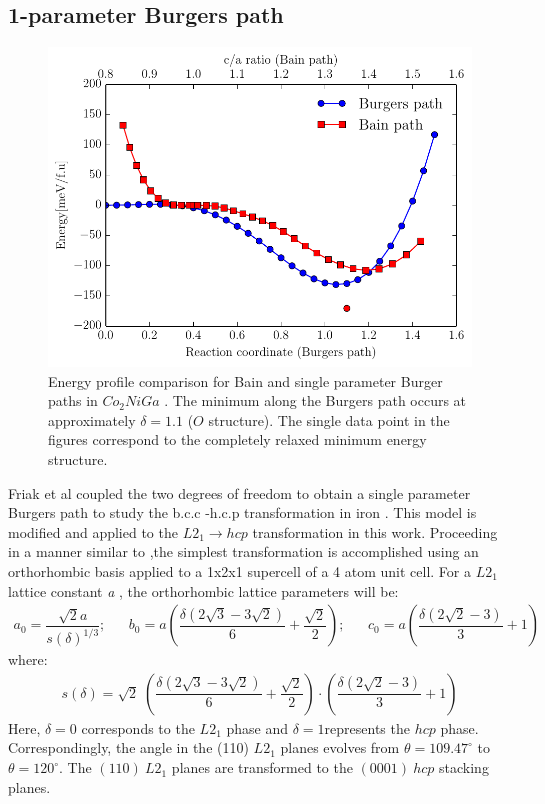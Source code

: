 \documentclass[%
preprint,
 amsmath,amssymb,
 aps,
prb,
showkeys,
]{revtex4-1}
\begin{document}
\subsection{1-parameter Burgers path}
\label{Sec:1D_formalism} 

\begin{figure}[htp!]
\includegraphics[scale=1.0]{figure_1}
\caption{ Energy profile comparison for Bain and single parameter Burger  paths in  $Co_2NiGa$ . The minimum along the Burgers path occurs at approximately $\delta =1.1$ ($O$ structure). The single data point in the figures correspond to the completely relaxed minimum energy structure.}  
\label{burger_bain}
\end{figure}

Friak et al \cite{friak2008ab} coupled the two degrees of freedom to obtain a single parameter Burgers path to study the b.c.c -h.c.p transformation in iron \cite{vsob1998ab,vsob1999proceedings,friak2008ab}. This model is modified and applied to the $L2_1 \rightarrow hcp$ transformation in this work.
Proceeding in a manner similar to \cite{friak2008ab},the simplest transformation is accomplished using  an orthorhombic basis applied to a 1x2x1 supercell of a 4 atom unit cell. For a $L2_{1}$ lattice constant \textit{a} , the orthorhombic lattice parameters will be:
\begin{align}
 a_0 = \dfrac{\sqrt{2}a}{{s(\delta)}^{1/3}}; \ \ \ \ \ \ \;
 b_0 = a\left(\dfrac{\delta(2\sqrt{3} - 3\sqrt{2})}{6} +\dfrac{ \sqrt{2}} {2} \right); \ \ \ \ \ \ \;
 c_0 = a\left( \dfrac{\delta (2\sqrt{2} - 3)}{3} + 1\right)
\end{align}
where:
\begin{align}
s(\delta) = \sqrt{2} \;\left( \dfrac{\delta(2\sqrt{3} - 3\sqrt{2})}{6}  + \dfrac{\sqrt{2}}{2}\right)\cdot \left( \dfrac{\delta(2\sqrt{2} - 3)} {3} + 1\right)
\end{align}
Here, $\delta =0 $ corresponds to the $L2_1$ phase and $\delta =1$represents the $hcp$ phase. 
Correspondingly, the angle in the (110) $L2_1$ planes evolves from $\theta=109.47 ^\circ $ to $\theta=120 ^\circ $. The $(110) \ L2_1$ planes are transformed to the $(0001) \ hcp $ stacking  planes. 
\end{document}
